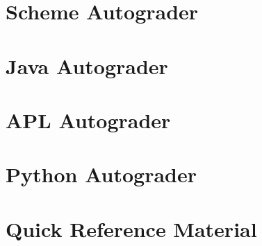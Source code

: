 \chapter{Scheme Autograder}

\chapter{Java Autograder}

\chapter{APL Autograder}

\chapter{Python Autograder}

\chapter{Quick Reference Material}

\bye

